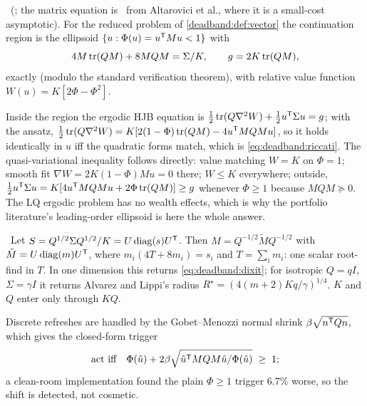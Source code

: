 \begin{theorem}
\label{deadband:thm:ellipsoid}
\tagEstablished\ (; the matrix equation is \tagTransported\ from Altarovici et al., where it is a small-cost asymptotic). For the reduced problem of \cref{deadband:def:vector} the continuation region is the ellipsoid $\{u : \Phi(u) = u^{\mathsf{T}} Mu < 1\}$ with
\begin{equation}
4M\operatorname{tr}(QM) + 8MQM = \Sigma/K, \qquad g = 2K\operatorname{tr}(QM),
\label{eq:deadband:riccati}
\end{equation}
exactly (modulo the standard verification theorem), with relative value function $W(u) = K[2\Phi - \Phi^2]$.
\end{theorem}

Inside the region the ergodic HJB equation is $\tfrac12\operatorname{tr}(Q\nabla^2W) + \tfrac12u^{\mathsf{T}}\Sigma u = g$; with the ansatz, $\tfrac12\operatorname{tr}(Q\nabla^2W) = K[2(1-\Phi)\operatorname{tr}(QM) - 4u^{\mathsf{T}} MQMu]$, so it holds identically in $u$ iff the quadratic forms match, which is \cref{eq:deadband:riccati}. The quasi-variational inequality follows directly: value matching $W = K$ on $\Phi = 1$; smooth fit $\nabla W = 2K(1-\Phi)Mu = 0$ there; $W \le K$ everywhere; outside, $\tfrac12u^{\mathsf{T}}\Sigma u = K[4u^{\mathsf{T}} MQMu + 2\Phi\operatorname{tr}(QM)] \ge g$ whenever $\Phi \ge 1$ because $MQM \succeq 0$. The LQ ergodic problem has no wealth effects, which is why the portfolio literature's leading-order ellipsoid is here the whole answer.

\begin{construction}
\label{deadband:con:whitening}
\tagEstablished\ Let $S = Q^{1/2}\Sigma Q^{1/2}/K = U\operatorname{diag}(s)U^{\mathsf{T}}$. Then $M = Q^{-1/2}\tilde MQ^{-1/2}$ with $\tilde M = U\operatorname{diag}(m)U^{\mathsf{T}}$, where $m_i(4T + 8m_i) = s_i$ and $T = \sum_i m_i$: one scalar root-find in $T$. In one dimension this returns \cref{eq:deadband:dixit}; for isotropic $Q = qI$, $\Sigma = \gamma I$ it returns Alvarez and Lippi's radius $R^\star = (4(m+2)Kq/\gamma)^{1/4}$. $K$ and $Q$ enter only through $KQ$.
\end{construction}

Discrete refreshes are handled by the Gobet--Menozzi normal shrink $\beta\sqrt{n^{\mathsf{T}} Qn}$, which gives the closed-form trigger
\begin{equation}
\text{act iff}\quad \Phi(\hat u) + 2\beta\sqrt{\hat u^{\mathsf{T}} MQM\hat u/\Phi(\hat u)} \;\ge\; 1 ;
\label{eq:deadband:trigger}
\end{equation}
a clean-room implementation found the plain $\Phi \ge 1$ trigger 6.7\% worse, so the shift is detected, not cosmetic.

